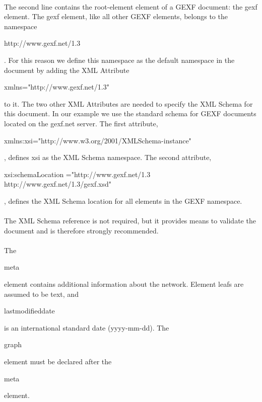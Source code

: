 \documentclass[a4paper,10pt]{article}
\begin{document}
\paragraph{}
The second line contains the root-element element of a GEXF document: the gexf element. The gexf element, like all other GEXF elements, belongs to the namespace \begin{footnotesize}http://www.gexf.net/1.3\end{footnotesize}. For this reason we define this namespace as the default namespace in the document by adding the XML Attribute \begin{footnotesize}xmlns="http://www.gexf.net/1.3"\end{footnotesize} to it. The two other XML Attributes are needed to specify the XML Schema for this document. In our example we use the standard schema for GEXF documents located on the gexf.net server. The first attribute, \begin{footnotesize}xmlns:xsi="http://www.w3.org/2001/XMLSchema-instance"\end{footnotesize}, defines xsi as the XML Schema namespace. The second attribute, \begin{footnotesize}xsi:schemaLocation ="http://www.gexf.net/1.3 http://www.gexf.net/1.3/gexf.xsd"\end{footnotesize}, defines the XML Schema location for all elements in the GEXF namespace.

\paragraph{}
The XML Schema reference is not required, but it provides means to validate the document and is therefore strongly recommended.

\paragraph{}
The \begin{footnotesize}meta\end{footnotesize} element contains additional information about the network. Element leafs are assumed to be text, and \begin{footnotesize}lastmodifieddate\end{footnotesize} is an international standard date (yyyy-mm-dd). The \begin{footnotesize}graph\end{footnotesize} element must be declared after the \begin{footnotesize}meta\end{footnotesize} element.
\end{document}
